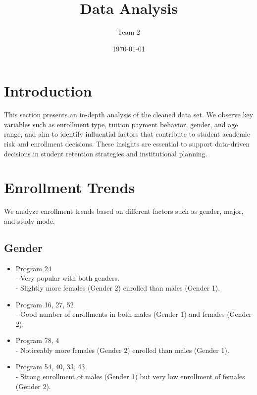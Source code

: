 \documentclass[12pt]{article}
\title{Data Analysis}
\author{Team 2}
\date{\today}
\begin{document}
\maketitle

\section{Introduction}
This section presents an in-depth analysis of the cleaned data set. We observe key variables such as enrollment type, tuition payment behavior, gender, and age range, and aim to identify influential factors that contribute to student academic risk and enrollment decisions. These insights are essential to support data-driven decisions in student retention strategies and institutional planning.


\section{Enrollment Trends}
We analyze enrollment trends based on different factors such as gender, major, and study mode.

\subsection{Gender}
\begin{itemize}
    \item Program 24\\
    - Very popular with both genders.\\
    - Slightly more females (Gender 2) enrolled than males (Gender 1).

    \item Program 16, 27, 52\\
    - Good number of enrollments in both males (Gender 1) and females (Gender 2).

    \item Program 78, 4\\
    - Noticeably more females (Gender 2) enrolled than males (Gender 1).

    \item Program 54, 40, 33, 43\\
    - Strong enrollment of males (Gender 1) but very low enrollment of females (Gender 2).
\end{itemize}
\end{document}
